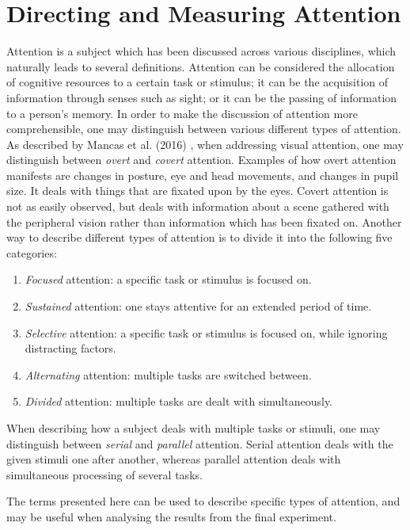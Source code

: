 \chapter{Directing and Measuring Attention}\label{ch:attention}
Attention is a subject which has been discussed across various disciplines, which naturally leads to several definitions. Attention can be considered the allocation of cognitive resources to a certain task or stimulus; it can be the acquisition of information through senses such as sight; or it can be the passing of information to a person’s memory. In order to make the discussion of attention more comprehensible, one may distinguish between various different types of attention. As described by Mancas et al. (2016) \cite{Mancas2016}, when addressing visual attention, one may distinguish between \textit{overt} and \textit{covert} attention. Examples of how overt attention manifests are changes in posture, eye and head movements, and changes in pupil size. It deals with things that are fixated upon by the eyes. Covert attention is not as easily observed, but deals with information about a scene gathered with the peripheral vision rather than information which has been fixated on. Another way to describe different types of attention is to divide it into the following five categories:

\begin{enumerate}
\item \textit{Focused} attention: a specific task or stimulus is focused on.
\item \textit{Sustained} attention: one stays attentive for an extended period of time.
\item \textit{Selective} attention: a specific task or stimulus is focused on, while ignoring distracting factors.
\item \textit{Alternating} attention: multiple tasks are switched between.
\item \textit{Divided} attention: multiple tasks are dealt with simultaneously.
\end{enumerate}

When describing how a subject deals with multiple tasks or stimuli, one may distinguish between \textit{serial} and \textit{parallel} attention. Serial attention deals with the given stimuli one after another, whereas parallel attention deals with simultaneous processing of several tasks.

The terms presented here can be used to describe specific types of attention, and may be useful when analysing the results from the final experiment.

